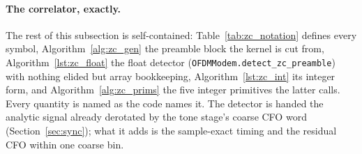 \paragraph{The correlator, exactly.}  The rest of this subsection is
self-contained: Table~\ref{tab:zc_notation} defines every symbol,
Algorithm~\ref{alg:zc_gen} the preamble block the kernel is cut
from, Algorithm~\ref{lst:zc_float} the float detector
(\texttt{OFDMModem.detect\_zc\_preamble}) with nothing elided but
array bookkeeping, Algorithm~\ref{lst:zc_int} its integer form, and
Algorithm~\ref{alg:zc_prims} the five integer primitives the latter
calls.  Every quantity is named as the code names it.  The detector is
handed the analytic signal already derotated by the tone stage's
coarse CFO word (Section~\ref{sec:sync}); what it adds is the
sample-exact timing and the residual CFO within one coarse bin.

